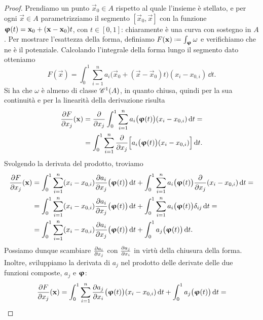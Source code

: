 \begin{proof} Prendiamo un punto $\vec x_0\in A$ rispetto al quale l'insieme è stellato, e per ogni $\vec x\in A$ parametrizziamo il segmento $[\vec x_0,\vec x]$ con la funzione $\vphi(t)=\vec x_0+(\vec x-\vec x_0)t$, con $t\in[0,1]$: chiaramente è una curva con sostegno in $A$.
	Per mostrare l'esattezza della forma, definiamo $F(\vec x)\defeq\int_{\vphi}\omega$ e verifichiamo che ne è il potenziale.
	Calcolando l'integrale della forma lungo il segmento dato otteniamo
	\begin{equation}
		F(\vec x)=\int_0^1\sum_{i=1}^na_i\big(\vec x_0+(\vec x-\vec x_0)t\big)(x_i-x_{0,i})\,\dd t.
	\end{equation}
	Si ha che $\omega$ è almeno di classe $\cont[1]{A}$, in quanto chiusa, quindi per la sua continuità e per la linearità della derivazione risulta
	\begin{equation}
		\begin{split}
			\drp{F}{x_j}(\vec x)&=\drp{}{x_j}\int_0^1\sum_{i=1}^na_i\big(\vphi(t)\big)(x_i-x_{0,i})\,\dd t=\\
			&=\int_0^1\sum_{i=1}^n\drp{}{x_j}\Big[a_i\big(\vphi(t)\big)(x_i-x_{0,i})\Big]\,\dd t.
		\end{split}
	\end{equation}
	Svolgendo la derivata del prodotto, troviamo
	\begin{equation}
		\begin{split}
			\drp{F}{x_j}(\vec x)&=\int_0^1\sum_{i=1}^n(x_i-x_{0,i})\drp{a_i}{x_j}\big(\vphi(t)\big)\,\dd t+\int_0^1\sum_{i=1}^na_i\big(\vphi(t)\big)\drp{}{x_j}(x_i-x_{0,i})\,\dd t=\\
			&=\int_0^1\sum_{i=1}^n(x_i-x_{0,i})\drp{a_i}{x_j}\big(\vphi(t)\big)\,\dd t+\int_0^1\sum_{i=1}^na_i\big(\vphi(t)\big)\delta_{ij}\,\dd t=\\
			&=\int_0^1\sum_{i=1}^n(x_i-x_{0,i})\drp{a_i}{x_j}\big(\vphi(t)\big)\,\dd t+\int_0^1a_j\big(\vphi(t)\big)\,\dd t.
		\end{split}
	\end{equation}
	Possiamo dunque scambiare $\drp{a_i}{x_j}$ con $\drp{a_j}{x_i}$ in virtù della chiusura della forma.
	Inoltre, sviluppiamo la derivata di $a_j$ nel prodotto delle derivate delle due funzioni composte, $a_j$ e $\vphi$:
	\begin{equation}
		\begin{split}
			\drp{F}{x_j}(\vec x)&=\int_0^1\sum_{i=1}^n\drp{a_j}{x_i}\big(\vphi(t)\big)(x_i-x_{0,i})\,\dd t+\int_0^1a_j\big(\vphi(t)\big)\,\dd t=\\

\end{split}
\end{equation}
\end{proof}
